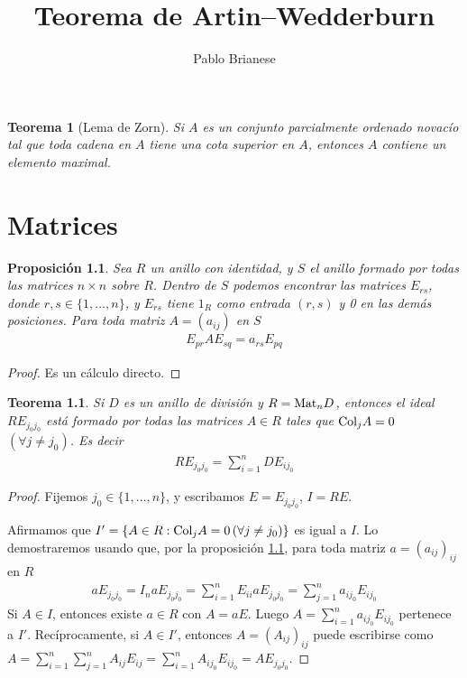 \documentclass{report}
\title{Teorema de Artin--Wedderburn}
\author{Pablo Brianese}
\newcommand{\Mat}{\textnormal{Mat}}
\newcommand{\Col}{\textnormal{Col}}
\newtheorem{theorem}{Teorema}
\newtheorem{proposition}{Proposición}
\begin{document}
  \maketitle

  \begin{theorem}[Lema de Zorn]
    Si \(A\) es un conjunto parcialmente ordenado novacío tal que toda cadena en \(A\) tiene una cota superior en \(A\), entonces \(A\) contiene un elemento maximal.
  \end{theorem}

  \chapter{Matrices}

  \begin{proposition}
    \label{proposition:matrixEntryCalculation}
    Sea \(R\) un anillo con identidad, y \(S\) el anillo formado por todas las matrices \(n \times n\) sobre \(R\).
    Dentro de \(S\) podemos encontrar las matrices \(E_{r s}\), donde \(r, s \in \{1, \dots, n\}\), y \(E_{r s}\) tiene \(1_R\) como entrada \((r, s)\) y 0 en las demás posiciones.
    Para toda matriz \(A = (a_{i j})\) en \(S\)
    \begin{align}
      E_{p r} A E_{s q}
      =
      a_{r s} E_{p q}
    \end{align}
  \end{proposition}
  \begin{proof}
    Es un cálculo directo.
  \end{proof}

  \begin{theorem}
    \label{theorem:matricesWhereAlmostEveryColumnIsNull}
    Si \(D\) es un anillo de división y \(R = \Mat_n D\), entonces el ideal \(R E_{j_0 j_0}\) está formado por todas las matrices \(A \in R\) tales que \(\Col_j A = 0\) \((\forall j \neq j_0)\).
	Es decir
	\begin{align}
	  R E_{j_0 j_0}
	  =
	  \sum_{i = 1}^n D E_{i j_0}
	\end{align}
  \end{theorem}
  \begin{proof}
    Fijemos \(j_0 \in \{1, \dots, n\}\), y escribamos \(E = E_{j_0 j_0}\), \(I = R E\).

    Afirmamos que \(I' = \{A \in R : \Col_j A = 0 \, (\forall j \neq j_0)\}\) es igual a \(I\).
    Lo demostraremos usando que, por la proposición \ref{proposition:matrixEntryCalculation}, para toda matriz \(a = (a_{i j})_{i j}\) en \(R\)
    \begin{align}
      a E_{j_0 j_0}
      =
      I_n a E_{j_0 j_0}
      =
      \sum_{i = 1}^n E_{i i} a E_{j_0 j_0}
      =
      \sum_{j = 1}^n a_{i j_0} E_{i j_0}
    \end{align}
    Si \(A \in I\), entonces existe \(a \in R\) con \(A = a E\).
    Luego \(A = \sum_{i = 1}^n a_{i j_0} E_{i j_0}\) pertenece a \(I'\).
    Recíprocamente, si \(A \in I'\), entonces \(A = (A_{i j})_{i j}\) puede escribirse como \(A = \sum_{i = 1}^n \sum_{j = 1}^n A_{i j} E_{i j} = \sum_{i = 1}^n A_{i j_0} E_{i j_0} = A E_{j_0 j_0}\).
  \end{proof}
\end{document}
